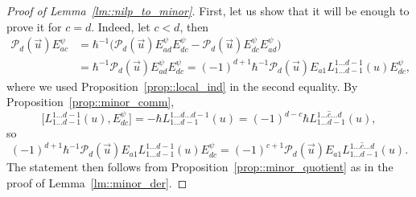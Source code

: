 \documentclass[10pt,a4paper]{article}
\numberwithin{equation}{section}
\newcommand{\calP}{\mathcal{P}}
\begin{document}
	\begin{proof}[Proof of Lemma~\ref{lm::nilp_to_minor}]
		First, let us show that it will be enough to prove it for $c=d$. Indeed, let $c<d$, then
		\begin{align*}
		\calP_d(\vec{u}) E_{ac}^{\psi} &= \hbar^{-1}\bigl(\calP_d(\vec{u}) E_{ad}^{\psi} E_{dc}^{\psi} - \calP_d(\vec{u}) 	E_{dc}^{\psi} E_{ad}^{\psi}\bigr) \\
		&	= \hbar^{-1} \calP_d(\vec{u}) E_{ad}^{\psi} E_{dc}^{\psi} = (-1)^{d+1} \hbar^{-1}\calP_d(\vec{u}) E_{a1} L_{1\dots d-1}^{1\dots d-1}(u) E_{dc}^{\psi},
		\end{align*}
		where we used Proposition~\ref{prop::local_ind} in the second equality. By Proposition~\ref{prop::minor_comm},
		\[
\bigl[L_{1\dots d-1}^{1\dots d-1}(u),E_{dc}^{\psi}\bigr] = - \hbar L_{1\dots d-1}^{1\dots d \dots d-1}(u) = (-1)^{d-c} \hbar L_{1\dots d-1}^{1\dots \hat{c} \dots d}(u),
\]
		so
		\[
		(-1)^{d+1} \hbar^{-1} \calP_d(\vec{u}) E_{a1} L_{1\dots d-1}^{1\dots d-1}(u) E_{dc}^{\psi} = (-1)^{c+1} \calP_d(\vec{u}) E_{a1} L_{1\dots d-1}^{1\dots \hat{c} \dots d}(u).
		\]
		The statement then follows from Proposition~\ref{prop::minor_quotient} as in the proof of Lemma~\ref{lm::minor_der}.
		

\end{proof}
\end{document}
